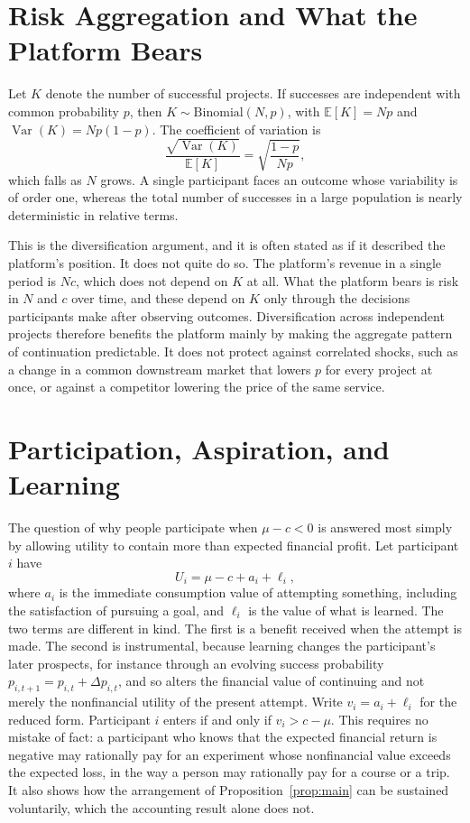 \documentclass[11pt]{article}
\theoremstyle{remark}
\newcommand{\E}{\mathbb{E}}
\newcommand{\Var}{\operatorname{Var}}
\begin{document}
\section{Risk Aggregation and What the Platform Bears}

Let $K$ denote the number of successful projects. If successes are independent with common probability $p$, then $K\sim\mathrm{Binomial}(N,p)$, with $\E[K]=Np$ and $\Var(K)=Np(1-p)$. The coefficient of variation is
\[
\frac{\sqrt{\Var(K)}}{\E[K]} = \sqrt{\frac{1-p}{Np}},
\]
which falls as $N$ grows. A single participant faces an outcome whose variability is of order one, whereas the total number of successes in a large population is nearly deterministic in relative terms.

This is the diversification argument, and it is often stated as if it described the platform's position. It does not quite do so. The platform's revenue in a single period is $Nc$, which does not depend on $K$ at all. What the platform bears is risk in $N$ and $c$ over time, and these depend on $K$ only through the decisions participants make after observing outcomes. Diversification across independent projects therefore benefits the platform mainly by making the aggregate pattern of continuation predictable. It does not protect against correlated shocks, such as a change in a common downstream market that lowers $p$ for every project at once, or against a competitor lowering the price of the same service.

\section{Participation, Aspiration, and Learning}\label{sec:part}

The question of why people participate when $\mu - c<0$ is answered most simply by allowing utility to contain more than expected financial profit. Let participant $i$ have
\[
U_i = \mu - c + a_i + \ell_i ,
\]
where $a_i$ is the immediate consumption value of attempting something, including the satisfaction of pursuing a goal, and $\ell_i$ is the value of what is learned. The two terms are different in kind. The first is a benefit received when the attempt is made. The second is instrumental, because learning changes the participant's later prospects, for instance through an evolving success probability $p_{i,t+1}=p_{i,t}+\Delta p_{i,t}$, and so alters the financial value of continuing and not merely the nonfinancial utility of the present attempt. Write $v_i=a_i+\ell_i$ for the reduced form. Participant $i$ enters if and only if $v_i > c-\mu$. This requires no mistake of fact: a participant who knows that the expected financial return is negative may rationally pay for an experiment whose nonfinancial value exceeds the expected loss, in the way a person may rationally pay for a course or a trip. It also shows how the arrangement of Proposition~\ref{prop:main} can be sustained voluntarily, which the accounting result alone does not.
\end{document}
